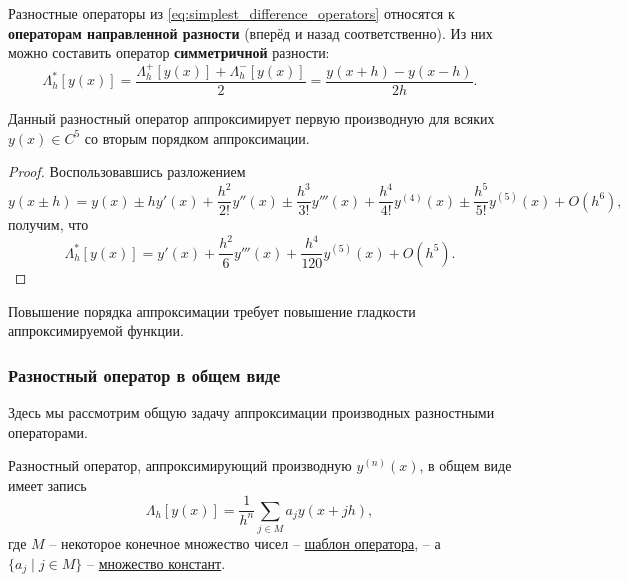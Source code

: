 \documentclass[../main.tex]{subfile}
\begin{document}
\begin{define}
	Разностные операторы из \eqref{eq:simplest_difference_operators}
	относятся к \textbf{операторам направленной разности} (вперёд и назад
	соответственно). Из них можно составить оператор \textbf{симметричной}
	разности:
	\[\Lambda_h^*[y(x)]=\frac{\Lambda_h^+[y(x)]+\Lambda_h^-[y(x)]}{2}=
	\frac{y(x+h)-y(x-h)}{2h}.\]
\end{define}

\begin{lemma}
	Данный разностный оператор аппроксимирует первую производную для всяких
	$y(x)\in C^5$ со вторым порядком аппроксимации.
\end{lemma}

\begin{proof}
	Воспользовавшись разложением
	\[y(x\pm h)=y(x)\pm hy'(x)+\frac{h^2}{2!}y''(x)\pm\frac{h^3}{3!}y'''(x)+
	\frac{h^4}{4!}y^{(4)}(x)\pm\frac{h^5}{5!}y^{(5)}(x)+O(h^6),\]
	получим, что
	\[\Lambda_h^*[y(x)]=y'(x)+\frac{h^2}{6}y'''(x)+\frac{h^4}{120}y^{(5)}(x)
	+O(h^5).\]
\end{proof}

\begin{remark}
	Повышение порядка аппроксимации требует повышение гладкости
	аппроксимируемой функции.
\end{remark}

\subsubsection{Разностный оператор в общем виде}
Здесь мы рассмотрим общую задачу аппроксимации производных разностными
операторами.

\begin{define}\label{eq:general_difference_operator}
	Разностный оператор, аппроксимирующий производную $y^{(n)}(x)$, в общем
	виде имеет запись
	\[\boxed{\Lambda_h[y(x)]=\frac{1}{h^n}\sum_{j\in M}a_jy(x+jh)},\]
	где $M$ -- некоторое конечное множество чисел -- \underline{шаблон
	оператора}, -- а \\ $\{a_j\mid j\in M\}$ -- \underline{множество констант}.
\end{define}
\end{document}
